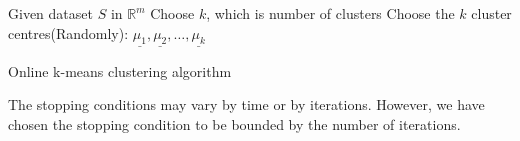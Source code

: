\documentclass{article}
\begin{document}
\begin{algorithm}[H]
\SetAlgoLined
 Given dataset $S$ in $\mathbb{R}^m$\;
 Choose $k$, which is number of clusters\;
 Choose the $k$ cluster centres(Randomly): $\underline{\mu_1}, \underline{\mu_2}, \dots, \underline{\mu_k}$\;
 \caption{Online k-means clustering algorithm}
\end{algorithm}

The stopping conditions may vary by time or by iterations. However, we have chosen the stopping condition to be bounded by the number of iterations.
\end{document}
